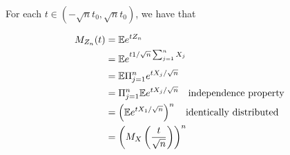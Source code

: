 
For each $ t \in (-\sqrt{n} t_0, \sqrt{n}t_0)$, we have that

\begin{align*}
    M_{Z_{n} } (t) &= \mathbb{E} e^{t Z_{n}  } \\
		   &= \mathbb{E} e^{t 1/\sqrt{n} \sum_{j=1}^{n} X_{j} }\\
		   &= \mathbb{E} \Pi_{j=1}^{n}   e^{t X_{j} /\sqrt{n}}\\
		   &= \Pi_{j=1}^{n} \mathbb{E} e^{t X_{j} /\sqrt{n}}\quad \mbox{independence property} \\
		   &= \left( \mathbb{E} e^{t X_1 /\sqrt{n}}  \right)^{n} \quad \mbox{identically
		   distributed}\\
		   &= \left( M_{X} \left( \frac{t}{\sqrt{n}}  \right)  \right)^{n} 
\end{align*}


